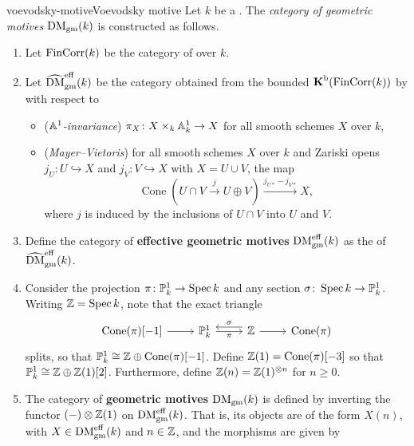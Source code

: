 \begin{topic}{voevodsky-motive}{Voevodsky motive}
    Let $k$ be a . The \textit{category of geometric motives} $\textup{DM}_\textup{gm}(k)$ is constructed as follows.
    \begin{enumerate}[label=(\roman*)]
        \item Let $\textup{FinCorr}(k)$ be the category of  over $k$.
        \item Let $\widehat{\textup{DM}}_\textup{gm}^\textup{eff}(k)$ be the category obtained from the bounded  $\textbf{K}^\textup{b}(\textup{FinCorr}(k))$ by  with respect to
        \begin{itemize}
            \item (\textit{$\AA^1$-invariance}) $\pi_X \colon X \times_k \AA^1_k \to X$ for all smooth schemes $X$ over $k$,
            \item (\textit{Mayer--Vietoris}) for all smooth schemes $X$ over $k$ and Zariski opens $j_U \colon U \hookrightarrow X$ and $j_V \colon V \hookrightarrow X$ with $X = U \cup V$, the map
            \[ \operatorname{Cone}(U \cap V \xrightarrow{j} U \oplus V) \xrightarrow{j_{U*} - j_{V*}} X , \]
            where $j$ is induced by the inclusions of $U \cap V$ into $U$ and $V$.
        \end{itemize}
        \item Define the category of \textbf{effective geometric motives} $\textup{DM}_\textup{gm}^\textup{eff}(k)$ as the  of $\widehat{\textup{DM}}_\textup{gm}^\textup{eff}(k)$.
        \item Consider the projection $\pi \colon \PP^1_k \to \Spec k$ and any section $\sigma \colon \Spec k \to \PP^1_k$. Writing $\ZZ = \Spec k$, note that the exact triangle
        \[ \svg \begin{tikzcd} \operatorname{Cone}(\pi)[-1] \arrow{r} & \PP^1_k \arrow[swap]{r}{\pi} & \ZZ \arrow{r} \arrow[shift right=0.4em, swap]{l}{\sigma} & \operatorname{Cone}(\pi) \end{tikzcd}  \]
        splits, so that $\PP^1_k \cong \ZZ \oplus \operatorname{Cone}(\pi)[-1]$. Define $\ZZ(1) = \operatorname{Cone}(\pi)[-3]$ so that $\PP^1_k \cong \ZZ \oplus \ZZ(1)[2]$. Furthermore, define $\ZZ(n) = \ZZ(1)^{\otimes n}$ for $n \ge 0$.
        \item The category of \textbf{geometric motives} $\textup{DM}_\textup{gm}(k)$ is defined by inverting the functor $(-) \otimes \ZZ(1)$ on $\textup{DM}_\textup{gm}^\textup{eff}(k)$. That is, its objects are of the form $X(n)$, with $X \in \textup{DM}_\textup{gm}^\textup{eff}(k)$ and $n \in \ZZ$, and the morphisms are given by

\end{enumerate}
\end{topic}
